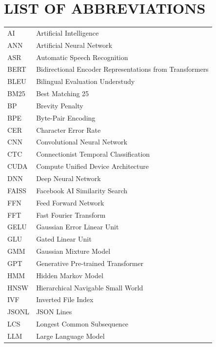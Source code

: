 \section*{LIST OF ABBREVIATIONS}

\vspace{0.5\baselineskip}  %

\renewcommand{\arraystretch}{1.25}  %

\begin{longtable}[l]{@{}ll@{}}  %
AI & Artificial Intelligence \\
ANN & Artificial Neural Network \\
ASR & Automatic Speech Recognition \\
BERT & Bidirectional Encoder Representations from Transformers \\
BLEU & Bilingual Evaluation Understudy \\
BM25 & Best Matching 25 \\
BP & Brevity Penalty \\
BPE & Byte-Pair Encoding \\
CER & Character Error Rate \\
CNN & Convolutional Neural Network \\
CTC & Connectionist Temporal Classification \\
CUDA & Compute Unified Device Architecture \\
DNN & Deep Neural Network \\
FAISS & Facebook AI Similarity Search \\
FFN & Feed Forward Network \\
FFT & Fast Fourier Transform \\
GELU & Gaussian Error Linear Unit \\
GLU & Gated Linear Unit \\
GMM & Gaussian Mixture Model \\
GPT & Generative Pre-trained Transformer \\
HMM & Hidden Markov Model \\
HNSW & Hierarchical Navigable Small World \\
IVF & Inverted File Index \\
JSONL & JSON Lines \\
LCS & Longest Common Subsequence \\
LLM & Large Language Model \\

\end{longtable}
